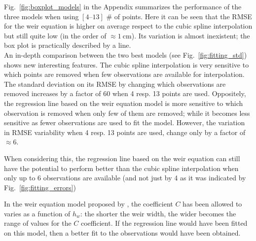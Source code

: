 
Fig.~\ref{fig:boxplot_models} in the Appendix summarizes the performance of the three models when using $[\numrange{4}{13}]$ \# of points.
Here it can be seen that the RMSE for the weir equation is higher on average respect to the cubic spline interpolation but still quite low (in the order of $\approx \SI{1}{\centi\meter}$).
Its variation is almost inexistent; the box plot is practically described by a line.\\

An in-depth comparison between the two best models (see Fig.~\ref{fig:fitting_std}) shows new interesting features.
The cubic spline interpolation is very sensitive to which points are removed when few observations are available for interpolation. The standard deviation on its RMSE by changing which observations are removed increases by a factor of \num{60} when \num{4} resp. \num{13} points are used.
Oppositely, the regression line based on the weir equation model is more sensitive to which observation is removed when only few of them are removed; while it becomes less sensitive as fewer observations are used to fit the model. However, the variation in RMSE variability  when \num{4} resp. \num{13} points are used, change only by a factor of $\approx \num{6}$.

When considering this, the regression line based on the weir equation can still have the potential to perform better than the cubic spline interpolation when only up to \num{6} observations are available (and not just by \num{4} as it was indicated by Fig.~\ref{fig:fitting_errors})

In the weir equation model proposed by \cite{brown_urban_2009}, the coefficient $C$ has been allowed to varies as a function of $h_w$:  the shorter the weir width, the wider becomes the range of values for the $C$ coefficient. If the regression line would have been fitted on this model, then a better fit to the observations would have been obtained.

